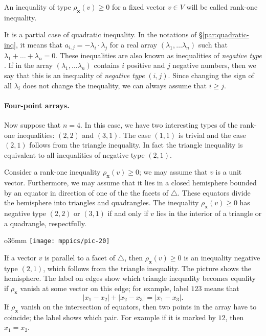 \documentclass[a4paper,10pt]{article}
\begin{document}
An inequality of type $\rho_{\bm{x}}(v)\ge 0$ for a fixed vector $v\in V$ will be called rank-one inequality.

It is a partial case of quadratic inequality.
In the notations of §\ref{par:quadratic-inq}, it means that $a_{i,j}=-\lambda_i\cdot\lambda_j$ for a real array $(\lambda_1,\dots \lambda_n)$ such that 
$\lambda_1+\dots+\lambda_n=0$.
These inequalities are also known as inequalities of \emph{negative type} \cite{deza-lauren}.
If in the array $(\lambda_1,\dots \lambda_n)$ contains $i$ positive and $j$ negative numbers,
then we say that this is an inequality of \emph{negative type} $(i,j)$.
Since changing the sign of all $\lambda_i$ does not change the inequality, we can always assume that $i\ge j$.

\paragraph{Four-point arrays.}\label{Four-point arrays}
Now suppose that $n=4$.
In this case, we have two interesting types of the rank-one inequalities: $(2,2)$ and $(3,1)$.
The case $(1,1)$ is trivial and 
the case $(2,1)$ follows from the triangle inequality.
In fact the triangle inequality is equivalent to all inequalities of negative type $(2,1)$.

Consider a rank-one inequality $\rho_{\bm{x}}(v)\ge 0$; we may assume that $v$ is a unit vector.
Furthermore, we may assume that it lies in a closed hemisphere bounded by an equator in direction of one of the the facets of $\triangle$.
These equators divide the hemisphere into triangles and quadrangles.
The inequality $\rho_{\bm{x}}(v)\ge 0$ has negative type $(2,2)$ or $(3,1)$
if and only if $v$ lies in the interior of a triangle or a quadrangle, respectfully.

\begin{wrapfigure}{o}{36mm}
\centering
\vskip-4mm
\texttt{[image: mppics/pic-20]}
\vskip-0mm
\end{wrapfigure}

If a vector $v$ is parallel to a facet of $\triangle$, then $\rho_{\bm{x}}(v)\ge 0$ is an inequality negative type $(2,1)$, which follows from the triangle inequality.
The picture shows the hemisphere.
The label on edges show which triangle inequality becomes equality if $\rho_{\bm{x}}$ vanish at some vector on this edge;
for example, label $123$ means that
\[|x_1-x_2|+|x_2-x_3|=|x_1-x_3|.\]
If $\rho_{\bm{x}}$ vanish on the intersection of equators, then two points in the array have to coincide;
the label shows which pair.
For example if it is marked by $12$, then $x_1=x_2$.
\end{document}
